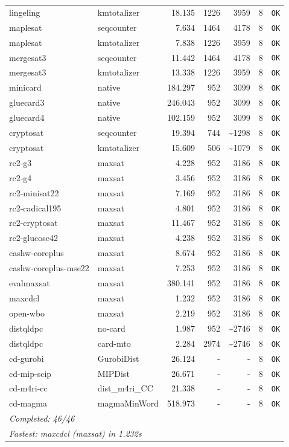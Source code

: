 \begin{longtable}{llrrrl p{}}
lingeling & kmtotalizer & 18.135 & 1226 & 3959 & 8 & \texttt{OK} \\
maplesat & seqcounter & 7.634 & 1464 & 4178 & 8 & \texttt{OK} \\
maplesat & kmtotalizer & 7.838 & 1226 & 3959 & 8 & \texttt{OK} \\
mergesat3 & seqcounter & 11.442 & 1464 & 4178 & 8 & \texttt{OK} \\
mergesat3 & kmtotalizer & 13.338 & 1226 & 3959 & 8 & \texttt{OK} \\
minicard & native & 184.297 & 952 & 3099 & 8 & \texttt{OK} \\
gluecard3 & native & 246.043 & 952 & 3099 & 8 & \texttt{OK} \\
gluecard4 & native & 102.159 & 952 & 3099 & 8 & \texttt{OK} \\
cryptosat & seqcounter & 19.394 & 744 & \textasciitilde{}1298 & 8 & \texttt{OK} \\
cryptosat & kmtotalizer & 15.609 & 506 & \textasciitilde{}1079 & 8 & \texttt{OK} \\
rc2-g3 & maxsat & 4.228 & 952 & 3186 & 8 & \texttt{OK} \\
rc2-g4 & maxsat & 3.456 & 952 & 3186 & 8 & \texttt{OK} \\
rc2-minisat22 & maxsat & 7.169 & 952 & 3186 & 8 & \texttt{OK} \\
rc2-cadical195 & maxsat & 4.801 & 952 & 3186 & 8 & \texttt{OK} \\
rc2-cryptosat & maxsat & 11.467 & 952 & 3186 & 8 & \texttt{OK} \\
rc2-glucose42 & maxsat & 4.238 & 952 & 3186 & 8 & \texttt{OK} \\
cashw-coreplus & maxsat & 8.674 & 952 & 3186 & 8 & \texttt{OK} \\
cashw-coreplus-mse22 & maxsat & 7.253 & 952 & 3186 & 8 & \texttt{OK} \\
evalmaxsat & maxsat & 380.141 & 952 & 3186 & 8 & \texttt{OK} \\
maxcdcl & maxsat & 1.232 & 952 & 3186 & 8 & \texttt{OK} \\
open-wbo & maxsat & 2.219 & 952 & 3186 & 8 & \texttt{OK} \\
distqldpc & no-card & 1.987 & 952 & \textasciitilde{}2746 & 8 & \texttt{OK} \\
distqldpc & card-mto & 2.284 & 2974 & \textasciitilde{}2746 & 8 & \texttt{OK} \\
cd-gurobi & GurobiDist & 26.124 & - & - & 8 & \texttt{OK} \\
cd-mip-scip & MIPDist & 26.671 & - & - & 8 & \texttt{OK} \\
cd-m4ri-cc & dist\_m4ri\_CC & 21.338 & - & - & 8 & \texttt{OK} \\
cd-magma & magmaMinWord & 518.973 & - & - & 8 & \texttt{OK} \\
\midrule
\multicolumn{7}{l}{\textit{Completed: 46/46}} \\
\multicolumn{7}{l}{\textit{Fastest: maxcdcl (maxsat) in 1.232s}} \\
\end{longtable}
